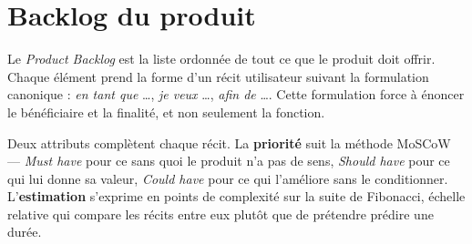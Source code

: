 \section{Backlog du produit}

Le \emph{Product Backlog} est la liste ordonnée de tout ce que le produit doit offrir.
Chaque élément prend la forme d'un récit utilisateur suivant la formulation canonique :
\emph{en tant que} \dots, \emph{je veux} \dots, \emph{afin de} \dots. Cette
formulation force à énoncer le bénéficiaire et la finalité, et non seulement la
fonction.

Deux attributs complètent chaque récit. La \textbf{priorité} suit la méthode MoSCoW ---
\emph{Must have} pour ce sans quoi le produit n'a pas de sens, \emph{Should have} pour
ce qui lui donne sa valeur, \emph{Could have} pour ce qui l'améliore sans le
conditionner. L'\textbf{estimation} s'exprime en points de complexité sur la suite de
Fibonacci, échelle relative qui compare les récits entre eux plutôt que de prétendre
prédire une durée.

